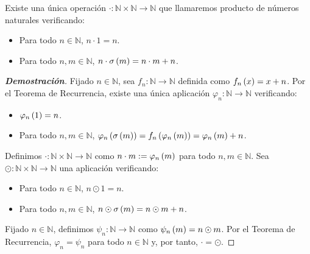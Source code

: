 \begin{proposition}
  \rm Existe una única operación $\cdot:\mathbb{N}\times\mathbb{N}\rightarrow\mathbb{N}$ que llamaremos producto de números naturales verificando:

  \begin{itemize}
    \item[1.] Para todo $n\in\mathbb{N}$, $n\cdot 1=n$.
    \item[2.] Para todo $n,m\in\mathbb{N}$, $n\cdot\sigma\left(m\right)=n\cdot m+n$.
  \end{itemize}
\begin{proof}[\rm\textbf{Demostración}]
  Fijado $n\in\mathbb{N}$, sea $f_n:\mathbb{N}\rightarrow\mathbb{N}$ definida como $f_n\left(x\right)=x+n$. Por el Teorema de Recurrencia, existe una única aplicación $\varphi_n:\mathbb{N}\rightarrow\mathbb{N}$ verificando:

  \begin{itemize}
  \item[1.] $\varphi_n\left(1\right)=n$.
  \item[2.] Para todo $n,m\in\mathbb{N}$, $\varphi_n\left(\sigma\left(m\right)\right)=f_n\left(\varphi_n\left(m\right)\right)=\varphi_n\left(m\right)+n$.
  \end{itemize}
  
  Definimos $\cdot:\mathbb{N}\times\mathbb{N}\rightarrow\mathbb{N}$ como $n\cdot m:=\varphi_n\left(m\right)$ para todo $n,m\in\mathbb{N}$. Sea $\odot:\mathbb{N}\times\mathbb{N}\rightarrow\mathbb{N}$ una aplicación verificando:

  \begin{itemize}
    \item[1.] Para todo $n\in\mathbb{N}$, $n\odot 1=n$.
    \item[2.] Para todo $n,m\in\mathbb{N}$, $n\odot\sigma\left(m\right)=n\odot m+n$.
  \end{itemize}

  Fijado $n\in\mathbb{N}$, definimos $\psi_n:\mathbb{N}\rightarrow\mathbb{N}$ como $\psi_n\left(m\right)=n\odot m$. Por el Teorema de Recurrencia, $\varphi_n=\psi_n$ para todo $n\in\mathbb{N}$ y, por tanto, $\cdot=\odot$.
\end{proof}
\end{proposition}
